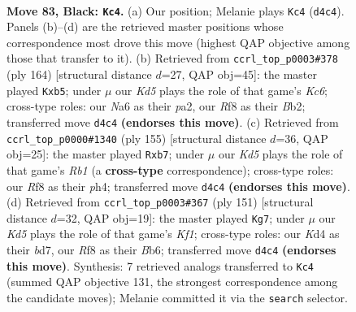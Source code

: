 \documentclass[11pt]{article}
\begin{document}
\clearpage

\begin{figure}[p]\centering
\begin{subfigure}{0.46\textwidth}\centering
\resizebox{\linewidth}{!}{%
\newchessgame
\chessboard[
  setfen={5r2/5p2/n5p1/4P2p/b2k1Pp1/6N1/7P/1B4K1 b - - 25 83},
  showmover=false,
  pgfstyle=straightmove, color=movearrow, markmove={d4-c4}
]}
\caption{}
\end{subfigure}\hfill
\begin{subfigure}{0.46\textwidth}\centering
\resizebox{\linewidth}{!}{%
\newchessgame
\chessboard[
  setfen={8/5k2/2K5/1p1pP3/1PpP2P1/2P2b2/pB6/8 w - - 5 83},
  showmover=false,
  pgfstyle=straightmove, color=movearrow, markmove={c6-b5}
]}
\caption{}
\end{subfigure}
\\[4pt]
\begin{subfigure}{0.46\textwidth}\centering
\resizebox{\linewidth}{!}{%
\newchessgame
\chessboard[
  setfen={1r5k/1P6/3p4/2p1pN2/B1P3pP/6P1/8/7K b - - 0 78},
  showmover=false,
  pgfstyle=straightmove, color=movearrow, markmove={b8-b7}
]}
\caption{}
\end{subfigure}\hfill
\begin{subfigure}{0.46\textwidth}\centering
\resizebox{\linewidth}{!}{%
\newchessgame
\chessboard[
  setfen={5k2/3B1p2/1b2p1p1/7p/5P1P/6P1/6K1/8 b - - 76 76},
  showmover=false,
  pgfstyle=straightmove, color=movearrow, markmove={f8-g7}
]}
\caption{}
\end{subfigure}
\caption{\textbf{Move 83, Black: \texttt{Kc4}.} (a) Our position; Melanie plays \texttt{Kc4} (\texttt{d4c4}). Panels (b)--(d) are the retrieved master positions whose correspondence most drove this move (highest QAP objective among those that transfer to it). (b) Retrieved from \texttt{ccrl\_top\_p0003\#378} (ply 164) [structural distance $d$=27, QAP obj=45]: the master played \texttt{Kxb5}; under $\mu$ our \emph{Kd5} plays the role of that game's \emph{Kc6}; cross-type roles: our \emph{N}a6 as their \emph{p}a2, our \emph{R}f8 as their \emph{B}b2; transferred move \texttt{d4c4} \textbf{(endorses this move)}. (c) Retrieved from \texttt{ccrl\_top\_p0000\#1340} (ply 155) [structural distance $d$=36, QAP obj=25]: the master played \texttt{Rxb7}; under $\mu$ our \emph{Kd5} plays the role of that game's \emph{Rb1} (a \textbf{cross-type} correspondence); cross-type roles: our \emph{R}f8 as their \emph{p}h4; transferred move \texttt{d4c4} \textbf{(endorses this move)}. (d) Retrieved from \texttt{ccrl\_top\_p0003\#367} (ply 151) [structural distance $d$=32, QAP obj=19]: the master played \texttt{Kg7}; under $\mu$ our \emph{Kd5} plays the role of that game's \emph{Kf1}; cross-type roles: our \emph{K}d4 as their \emph{b}d7, our \emph{R}f8 as their \emph{B}b6; transferred move \texttt{d4c4} \textbf{(endorses this move)}. Synthesis: 7 retrieved analogs transferred to \texttt{Kc4} (summed QAP objective 131, the strongest correspondence among the candidate moves); Melanie committed it via the \texttt{search} selector.}
\label{fig:thought-m165}
\end{figure}
\end{document}
